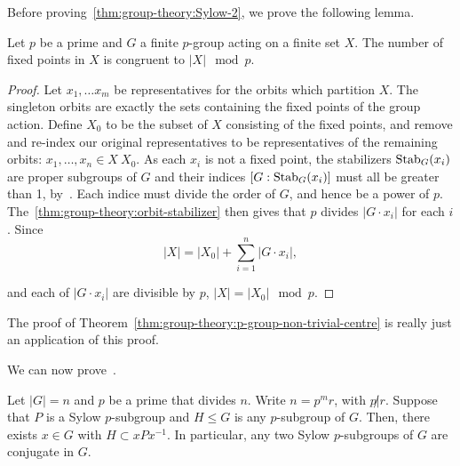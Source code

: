 Before proving~\ref{thm:group-theory:Sylow-2}, we prove the following lemma.

\begin{lemma}\label{lem:group-theory:fixed-points-p-group-action}
  Let \(p\) be a prime and \(G\) a finite \(p\)-group acting on a finite set \(X\). The number of fixed points in \(X\) is congruent to \(|X| \mod p\).
\end{lemma}

\begin{proof}
  Let \(x_{1}, \ldots x_{m}\) be representatives for the orbits which partition \(X\). The singleton orbits are exactly the sets containing the fixed points of the group action. Define \(X_{0}\) to be the subset of \(X\) consisting of the fixed points, and remove and re-index our original representatives to be representatives of the remaining orbits: \(x_{1}, \ldots, x_{n} \in X \ X_{0}\). As each \(x_{i}\) is not a fixed point, the stabilizers \(\operatorname{Stab}_{G}(x_{i})\) are proper subgroups of \(G\) and their indices \([G : \operatorname{Stab}_{G}(x_{i})]\) must all be greater than 1, by~. Each indice must divide the order of \(G\), and hence be a power of \(p\). The~\ref{thm:group-theory:orbit-stabilizer} then gives that \(p\) divides \(|G \cdot x_{i}|\) for each \(i\). Since
  \[|X| = |X_{0}| + \sum_{i=1}^{n} |G \cdot x_{i}|,\]

  and each of \(|G \cdot x_{i}|\) are divisible by \(p\), \(|X| = |X_{0}| \mod p\).
\end{proof}

\begin{note}
  The proof of Theorem~\ref{thm:group-theory:p-group-non-trivial-centre} is really just an application of this proof.
\end{note}

We can now prove~.

\begin{theorem}[Sylow 2]\label{thm:group-theory:Sylow-2}
  Let \(|G| = n\) and \(p\) be a prime that divides \(n\). Write \(n = p^{m}r\), with \(p \not| r\). Suppose that \(P\) is a Sylow \(p\)-subgroup and \(H \leq G\) is any \(p\)-subgroup of \(G\). Then, there exists \(x \in G\) with \(H \subset xPx^{-1}\). In particular, any two Sylow \(p\)-subgroups of \(G\) are conjugate in \(G\).
\end{theorem}

